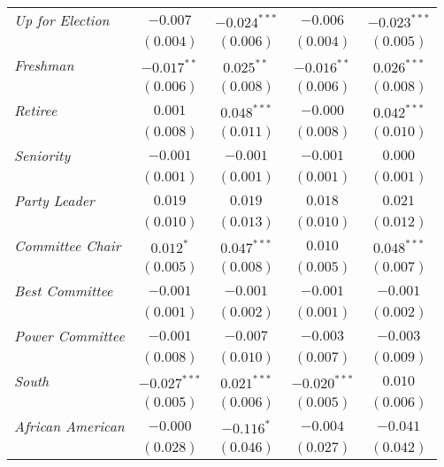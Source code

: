 \documentclass[12pt]{article}
\begin{document}
\begin{table}
\begin{center}
\begin{tabular}{l c c c c }
			\textit{Up for Election}           & $-0.007$       & $-0.024^{***}$ & $-0.006$       & $-0.023^{***}$ \\
			& $(0.004)$      & $(0.006)$      & $(0.004)$      & $(0.005)$      \\
			\textit{Freshman}                      & $-0.017^{**}$  & $0.025^{**}$   & $-0.016^{**}$  & $0.026^{***}$  \\
			& $(0.006)$      & $(0.008)$      & $(0.006)$      & $(0.008)$      \\
			\textit{Retiree}                       & $0.001$        & $0.048^{***}$  & $-0.000$       & $0.042^{***}$  \\
			& $(0.008)$      & $(0.011)$      & $(0.008)$      & $(0.010)$      \\
			\textit{Seniority}                     & $-0.001$       & $-0.001$       & $-0.001$       & $0.000$        \\
			& $(0.001)$      & $(0.001)$      & $(0.001)$      & $(0.001)$      \\
			\textit{Party Leader}                       & $0.019$        & $0.019$        & $0.018$        & $0.021$        \\
			& $(0.010)$      & $(0.013)$      & $(0.010)$      & $(0.012)$      \\
			\textit{Committee Chair}                        & $0.012^{*}$    & $0.047^{***}$  & $0.010$        & $0.048^{***}$  \\
			& $(0.005)$      & $(0.008)$      & $(0.005)$      & $(0.007)$      \\
			\textit{Best Committee}               & $-0.001$       & $-0.001$       & $-0.001$       & $-0.001$       \\
			& $(0.001)$      & $(0.002)$      & $(0.001)$      & $(0.002)$      \\
			\textit{Power Committee}              & $-0.001$       & $-0.007$       & $-0.003$       & $-0.003$       \\
			& $(0.008)$      & $(0.010)$      & $(0.007)$      & $(0.009)$      \\
			\textit{South}                       & $-0.027^{***}$ & $0.021^{***}$  & $-0.020^{***}$ & $0.010$        \\
			& $(0.005)$      & $(0.006)$      & $(0.005)$      & $(0.006)$      \\
			\textit{African American}                          & $-0.000$       & $-0.116^{*}$   & $-0.004$       & $-0.041$       \\
			& $(0.028)$      & $(0.046)$      & $(0.027)$      & $(0.042)$      \\

\end{tabular}
\end{center}
\end{table}
\end{document}
